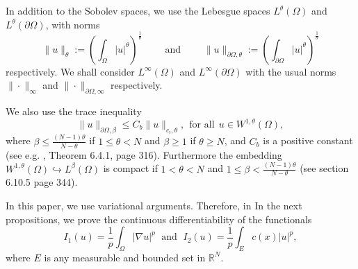 \documentclass[pdflatex,sn-mathphys-num]{sn-jnl}
\theoremstyle{thmstyleone}%
\theoremstyle{thmstyletwo}%
\theoremstyle{thmstylethree}%
\theoremstyle{thmstylethree}%
\begin{document}
In addition to the Sobolev spaces, we use the Lebesgue spaces $L^\theta (\Omega)$ and $L^\theta (\partial \Omega)$, with norms 
\begin{equation*}
    \|u\|_\theta :=\left(\int_{\Omega} |u|^{\theta}\right)^\frac{1}{\theta} \qquad \mbox{ and } \qquad     \|u\|_{\partial \Omega, \theta}:=\left(\int_{\partial\Omega} |u|^{\theta} \right)^\frac{1}{\theta}
\end{equation*}
respectively. We shall consider  $L^\infty (\Omega)$ and $L^\infty (\partial\Omega)$ with the usual norms $\|\cdot \|_\infty$ and $\|\cdot \|_{\partial\Omega , \infty}$ respectively. 


We also use the trace inequality  
\begin{equation}\label{trace_ineq}
    \displaystyle \|u\|_{\partial\Omega, \beta} \leqslant C_b \|u\|_{c_i,\theta},\ \ \text{for all}\ \ u\in W^{1,\theta}(\Omega),
\end{equation}  where $\beta\le \frac{(N-1)\theta}{N-\theta}$ if $1\le \theta <N$ and $\beta\ge 1$ if $\theta \ge N$, and $C_b$ is a positive constant (see e.g. \cite{KJF}, Theorem 6.4.1, page 316). Furthermore the embedding $W^{1,\theta}(\Omega) \hookrightarrow L^{\beta}(\Omega)$ is compact if $1<\theta<N$ and $1\leqslant \beta <\frac{(N-1)\theta}{N-\theta}$ (see \cite{KJF} section 6.10.5 page 344).

In this paper, we use  variational arguments. Therefore, in In the next propositions, we prove the continuous differentiability of the functionals 
$$I_1(u)=\frac{1}{p}\int_{\Omega} |\nabla u|^p \; \mbox{ and } \; I_2(u)=\frac{1}{p}\int_{E} c(x)|u|^p,$$
where $E$ is any measurable and bounded set in $\mathbb{R}^N$.
\end{document}
